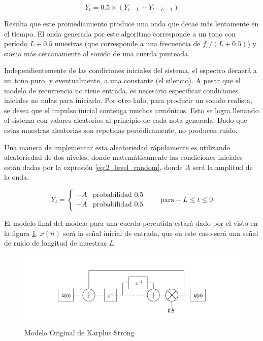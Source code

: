 \begin{equation}
    Y_t = 0.5\times \left(Y_{t-L}+Y_{t-L-1}\right)
    \label{eq:KS_avg}
\end{equation}

Resulta que este promediamiento produce una onda que decae más lentamente en el tiempo. El onda generada por este algoritmo corresponde a un tono con período $L + 0.5$ muestras (que corresponde a una frecuencia de $f_s / (L+0.5)$) y suena más cercanamente al sonido de una cuerda punteada.

Independientemente de las condiciones iniciales del sistema, el espectro decaerá a un tono puro, y eventualmente, a una constante (el silencio). A pesar que el modelo de recurrencia no tiene entrada, es necesario especificar condiciones iniciales no nulas para iniciarlo. Por otro lado, para producir un sonido realista, se desea que el impulso inicial contenga muchos armónicos.
Esto se logra llenando el sistema con valores aleatorios al principio de cada nota generada. Dado que estas muestras aleatorias son repetidas periódicamente, no producen ruido.

Una manera de implementar esta aleatoriedad rápidamente es utilizando aleatoriedad de dos niveles, donde matemáticamente las condiciones iniciales están dadas por la expresión \eqref{eq:2_level_random}, donde $A$ será la amplitud de la onda.

\begin{equation}
    Y_t = 
    \begin{cases}
        +A  &   \text{probabilidad 0.5}\\
        -A  &   \text{probabilidad 0.5}
    \end{cases}
    \qquad  \text{para} -L\leq t \leq 0
    \label{eq:2_level_random}
\end{equation}

El modelo final del modelo para una cuerda percutida estará dado por el visto en la figura \ref{fig:ks_original}. $x(n)$ será la señal inicial de entrada, que en este caso será una señal de ruido de longitud de muestras $L$.

\begin{figure}[ht]
    \centering
    \includegraphics[width = \linewidth]{res/fig_ks.png}
    \caption{Modelo Original de Karplus Strong}
    \label{fig:ks_original}
\end{figure}

